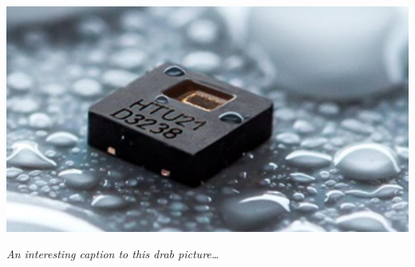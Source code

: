 
\begin{multicols}{3}

\blindtext \\

\end{multicols} 

\begin{center}
\vspace{10pt}
\includegraphics[width=0.8\linewidth]{graphics/placeholder.jpg} 
\par\large\textit{An interesting caption to this drab picture\ldots}
\vspace{10pt}
\end{center}